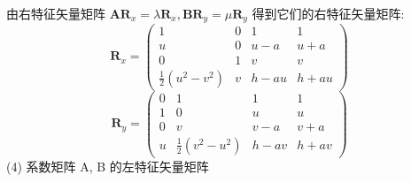 \documentclass[12pt]{article}
\begin{document}
由右特征矢量矩阵 $\bm{A} \bm{R}_{x}=\lambda \bm{R}_{x}, \bm{B} \bm{R}_{y}=\mu \bm{R}_{y}$ 得到它们的右特征矢量矩阵:
\begin{equation}
	\bm{R}_{x}=\left(\begin{array}{cccc}
			1                                   & 0 & 1     & 1     \\
			u                                   & 0 & u-a   & u+a   \\
			0                                   & 1 & v     & v     \\
			\frac{1}{2}\left(u^{2}-v^{2}\right) & v & h-a u & h+a u
		\end{array}\right)
\end{equation}
\begin{equation}
	\bm{R}_{y}=\left(\begin{array}{cccc}
			0 & 1                                   & 1     & 1     \\
			1 & 0                                   & u     & u     \\
			0 & v                                   & v-a   & v+a   \\
			u & \frac{1}{2}\left(v^{2}-u^{2}\right) & h-a v & h+a v
		\end{array}\right)
\end{equation}
(4) 系数矩阵  A, B  的左特征矢量矩阵
\end{document}
